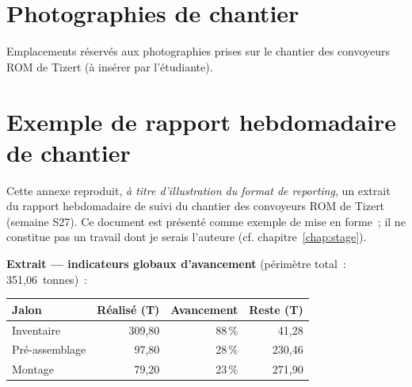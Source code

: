 \begin{appendices}
\chapter{Photographies de chantier}
\label{ann:photos}

Emplacements réservés aux photographies prises sur le chantier des convoyeurs ROM de Tizert (à insérer par l'étudiante).

\begin{center}
\end{center}

\chapter{Exemple de rapport hebdomadaire de chantier}
\label{ann:rapport}

Cette annexe reproduit, \emph{à titre d'illustration du format de reporting}, un extrait du rapport hebdomadaire de suivi du chantier des convoyeurs ROM de Tizert (semaine S27). Ce document est présenté comme exemple de mise en forme~; il ne constitue pas un travail dont je serais l'auteure (cf. chapitre~\ref{chap:stage}).

\vspace{3mm}
\textbf{Extrait --- indicateurs globaux d'avancement} (périmètre total~: 351,06~tonnes)~:

\begin{center}
\renewcommand{\arraystretch}{1.2}
\begin{tabular}{@{}l r r r@{}}
\toprule
\textbf{Jalon} & \textbf{Réalisé (T)} & \textbf{Avancement} & \textbf{Reste (T)} \\
\midrule
Inventaire & 309,80 & 88\,\% & 41,28 \\
Pré-assemblage & 97,80 & 28\,\% & 230,46 \\
Montage & 79,20 & 23\,\% & 271,90 \\
\bottomrule
\end{tabular}
\end{center}


\end{appendices}
